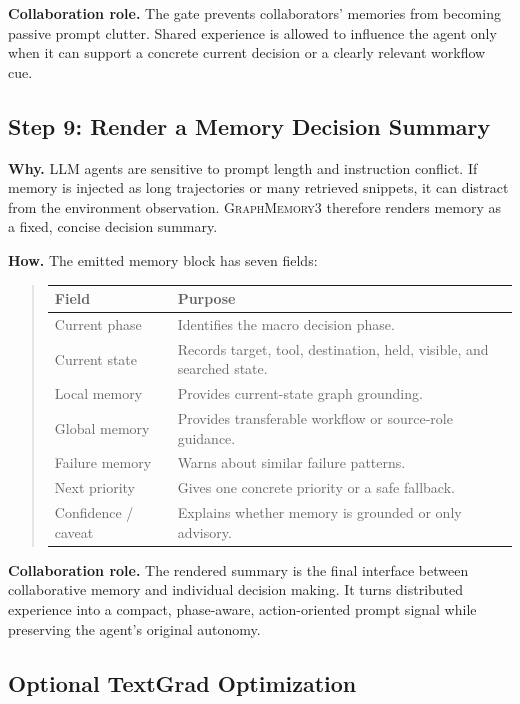 \documentclass[11pt]{article}
\newcommand{\modelname}{\textsc{GraphMemory3}\xspace}
\begin{document}
\textbf{Collaboration role.} The gate prevents collaborators' memories from
becoming passive prompt clutter. Shared experience is allowed to influence the
agent only when it can support a concrete current decision or a clearly relevant
workflow cue.

\subsection{Step 9: Render a Memory Decision Summary}

\textbf{Why.} LLM agents are sensitive to prompt length and instruction conflict.
If memory is injected as long trajectories or many retrieved snippets, it can
distract from the environment observation. \modelname therefore renders memory as
a fixed, concise decision summary.

\textbf{How.} The emitted memory block has seven fields:
\begin{quote}
\small
\begin{tabular}{@{}ll@{}}
\toprule
Field & Purpose \\
\midrule
Current phase & Identifies the macro decision phase. \\
Current state & Records target, tool, destination, held, visible, and searched state. \\
Local memory & Provides current-state graph grounding. \\
Global memory & Provides transferable workflow or source-role guidance. \\
Failure memory & Warns about similar failure patterns. \\
Next priority & Gives one concrete priority or a safe fallback. \\
Confidence / caveat & Explains whether memory is grounded or only advisory. \\
\bottomrule
\end{tabular}
\end{quote}

\textbf{Collaboration role.} The rendered summary is the final interface between
collaborative memory and individual decision making. It turns distributed
experience into a compact, phase-aware, action-oriented prompt signal while
preserving the agent's original autonomy.

\subsection{Optional TextGrad Optimization}
\end{document}
